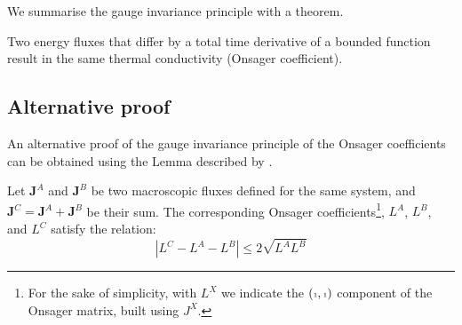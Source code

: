We summarise the gauge invariance principle with a theorem.
\begin{theorem} \label{th:gauge-invariance}
Two energy fluxes that differ by a total time derivative of a bounded function result in the same thermal conductivity (Onsager coefficient).
\end{theorem}


\subsection{Alternative proof}  \label{sec:gauge-proof}
An alternative proof of the gauge invariance principle of the Onsager coefficients can be obtained using the Lemma described by \citet{Marcolongo2016}.

\begin{lemma} \label{th:aris-theorem}
Let $\mathbf{J}^A$ and $\mathbf{J}^B$ be two macroscopic fluxes defined for the same system, and  $\mathbf{J}^{C} = \mathbf{J}^A + \mathbf{J}^B$ be their sum. The corresponding Onsager coefficients\footnote{For the sake of simplicity, with $L^X$ we indicate the $({\scriptscriptstyle 1},{\scriptscriptstyle 1})$ component of the Onsager matrix, built using $J^X$.
}, $L^{A}$, $L^{B}$, and $L^{C}$ satisfy the relation:
\begin{equation} \label{eq:aris-theorem}
    \left| L^{C} - L^{A} - L^{B} \right| \leq 2 \sqrt{L^{A} L^{B}}
\end{equation}
\end{lemma}

